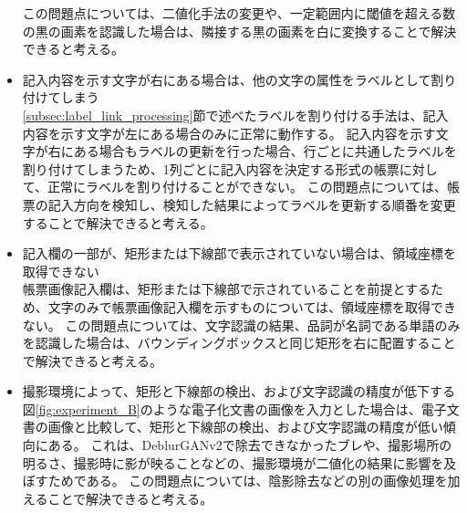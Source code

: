 \begin{itemize}
        この問題点については、二値化手法の変更や、一定範囲内に閾値を超える数の黒の画素を認識した場合は、隣接する黒の画素を白に変換することで解決できると考える。
    \item 記入内容を示す文字が右にある場合は、他の文字の属性をラベルとして割り付けてしまう\\
        \ref{subsec:label_link_processing}節で述べたラベルを割り付ける手法は、記入内容を示す文字が左にある場合のみに正常に動作する。
        記入内容を示す文字が右にある場合もラベルの更新を行った場合、行ごとに共通したラベルを割り付けてしまうため、1列ごとに記入内容を決定する形式の帳票に対して、正常にラベルを割り付けることができない。
        この問題点については、帳票の記入方向を検知し、検知した結果によってラベルを更新する順番を変更することで解決できると考える。
    \item 記入欄の一部が、矩形または下線部で表示されていない場合は、領域座標を取得できない\\
        帳票画像記入欄は、矩形または下線部で示されていることを前提とするため、文字のみで帳票画像記入欄を示すものについては、領域座標を取得できない。
        この問題点については、文字認識の結果、品詞が名詞である単語のみを認識した場合は、バウンディングボックスと同じ矩形を右に配置することで解決できると考える。
    \item 撮影環境によって、矩形と下線部の検出、および文字認識の精度が低下する\\
        図\ref{fig:experiment_B}のような電子化文書の画像を入力とした場合は、電子文書の画像と比較して、矩形と下線部の検出、および文字認識の精度が低い傾向にある。
        これは、DeblurGANv2で除去できなかったブレや、撮影場所の明るさ、撮影時に影が映ることなどの、撮影環境が二値化の結果に影響を及ぼすためである。
        この問題点については、陰影除去などの別の画像処理を加えることで解決できると考える。
\end{itemize}